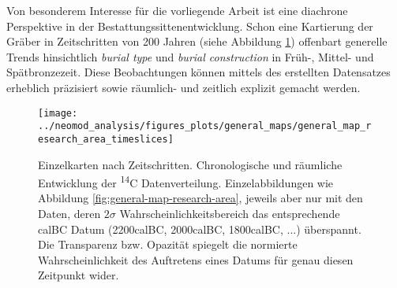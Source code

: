 \documentclass[openany,twoside,twocolumn]{book}
\begin{document}
Von besonderem Interesse für die vorliegende Arbeit ist eine diachrone
Perspektive in der Bestattungssittenentwicklung. Schon eine Kartierung
der Gräber in Zeitschritten von 200 Jahren (siehe Abbildung
\ref{fig:general-map-research-area-timeslices}) offenbart generelle
Trends hinsichtlich \emph{burial type} und \emph{burial construction} in
Früh-, Mittel- und Spätbronzezeit. Diese Beobachtungen können mittels
des erstellten Datensatzes erheblich präzisiert sowie räumlich- und
zeitlich explizit gemacht werden.

\begin{landscape}
\begin{figure}
\texttt{[image: ../neomod\_analysis/figures\_plots/general\_maps/general\_map\_research\_area\_timeslices]} \caption[Einzelkarten nach Zeitschritten]{Einzelkarten nach Zeitschritten. Chronologische und räumliche Entwicklung der \textsuperscript{14}C Datenverteilung. Einzelabbildungen wie Abbildung \ref{fig:general-map-research-area}, jeweils aber nur mit den Daten, deren $2\sigma$ Wahrscheinlichkeitsbereich das entsprechende calBC Datum (2200calBC, 2000calBC, 1800calBC, ...) überspannt. Die Transparenz bzw. Opazität spiegelt die normierte Wahrscheinlichkeit des Auftretens eines Datums für genau diesen Zeitpunkt wider.}\label{fig:general-map-research-area-timeslices}
\end{figure}
\end{landscape}
\end{document}
